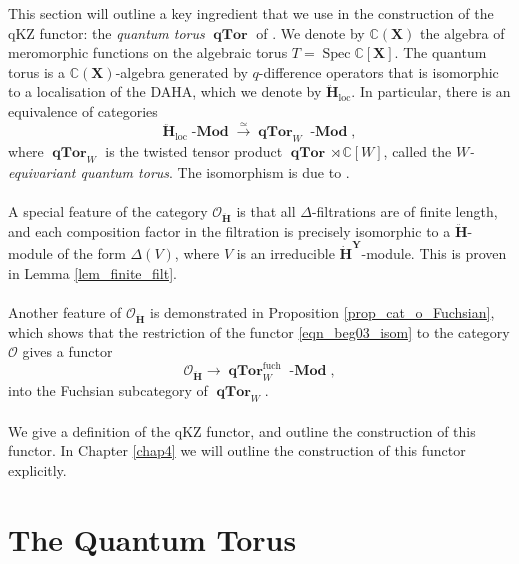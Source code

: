 \documentclass[a4paper]{report}
\theoremstyle{theorem}
\theoremstyle{definition}
\theoremstyle{remark}
\theoremstyle{proposition}
\theoremstyle{conjecture}
\theoremstyle{lemma}
\theoremstyle{corollary}
\theoremstyle{exercise}
\theoremstyle{example}
\newcommand{\C}{\mathbb{C}}
\newcommand{\mcal}{\mathcal}
\newcommand{\on}{\operatorname}
\newcommand{\spec}{\on{Spec}}
\newcommand{\coh}{\on{\mathbf{Coh}}}
\newcommand{\lmod}{\on{\mathbf{-Mod}}}
\newcommand{\qTor}{\on{\mathbf{qTor}}}
\newcommand{\qKZ}{\on{\mathit{q}KZ}}
\begin{document}
  This section will outline a key ingredient that we use in the 
  construction of the qKZ functor: the \emph{quantum torus} $\qTor$ of \cite{beg00}.
  We denote by $\C(\mathbf{X})$ the algebra of meromorphic functions on the algebraic torus 
  $T = \spec\C[\mathbf{X}]$.
  The quantum torus is a $\C(\mathbf{X})$-algebra generated by $q$-difference
  operators that is isomorphic to a localisation of the DAHA, which we denote 
  by $\mathbf{\ddot{\mathbf{H}}}_{\on{loc}}$. In particular, there is an equivalence
  of categories 
  \begin{equation}\label{eqn_beg03_isom}
      \mathbf{\ddot{\mathbf{H}}}_{\on{loc}}\lmod \stackrel{\simeq}{\longrightarrow} \qTor_W\lmod,
  \end{equation}
  where $\qTor_W$ is the twisted tensor product $\qTor \rtimes \C[W]$, called 
  the \emph{$W$-equivariant quantum torus}. 
  The isomorphism is due to \cite[Theorem 7.2]{beg00}.\\\\
  A special feature of the category $\mcal{O}_{\mathbf{\ddot{\mathbf{H}}}}$ is that all $\Delta$-filtrations are of finite length, and each 
  composition factor in the filtration is precisely isomorphic to a $\mathbf{\ddot{\mathbf{H}}}$-module
  of the form $\Delta(V)$, where $V$ is an irreducible $\mathbf{\dot{H}}^{\mathbf{Y}}$-module. This is proven in Lemma \ref{lem_finite_filt}.\\\\
  Another feature of $\mcal{O}_{\mathbf{\ddot{\mathbf{H}}}}$ is demonstrated in
  Proposition \ref{prop_cat_o_Fuchsian}, which shows that the restriction of the 
  functor \eqref{eqn_beg03_isom} to the category 
  $\mcal{O}$ gives a functor $$\mcal{O}_{\mathbf{\ddot{\mathbf{H}}}} \longrightarrow \qTor_W^{\on{fuch}}\lmod,$$
  into the Fuchsian subcategory of $\qTor_W$. \\\\
  We give a definition of the qKZ functor, and outline the construction of this functor. 
  In Chapter \ref{chap4} we will outline the construction of this functor explicitly.
  
  \section{The Quantum Torus}
  
\end{document}
